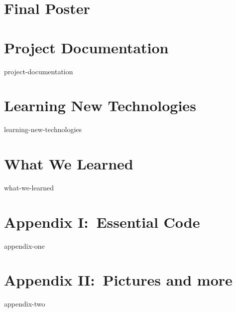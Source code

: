\documentclass[a4paper]{article}
\begin{document}
\section{Final Poster}


\section{Project Documentation}
{project-documentation}

\section{Learning New Technologies}
{learning-new-technologies}

\section{What We Learned}
{what-we-learned}

\section{Appendix I:\ Essential Code}
{appendix-one}

\section{Appendix II:\ Pictures and more}
{appendix-two}
\end{document}
